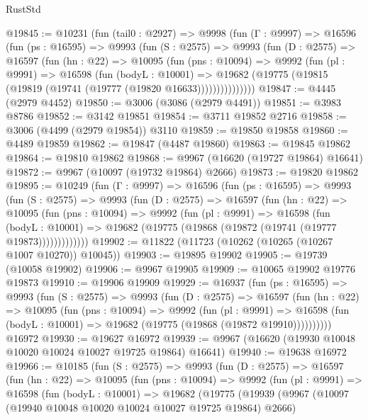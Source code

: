 \begin{lexlean}{RustStd}
\begin{coremodule}
@19845 := @10231
    (fun (tail0 : @2927) =>
    @9998
      (fun (Γ : @9997) =>
      @16596
        (fun (ps : @16595) =>
        @9993
          (fun (S : @2575) =>
          @9993
            (fun (D : @2575) =>
            @16597
              (fun (hn : @22) =>
              @10095
                (fun (pns : @10094) =>
                @9992
                  (fun (pl : @9991) =>
                  @16598
                    (fun (bodyL : @10001) =>
                    @19682 (@19775 (@19815 (@19819 (@19741 (@19777 (@19820 @16633)))))))))))))))
@19847 := @4445 (@2979 @4452)
@19850 := @3006 (@3086 (@2979 @4491))
@19851 := @3983 @8786
@19852 := @3142 @19851
@19854 := @3711 @19852 @2716
@19858 := @3006 (@4499 (@2979 @19854)) @3110
@19859 := @19850 @19858
@19860 := @4489 @19859
@19862 := @19847 (@4487 @19860)
@19863 := @19845 @19862
@19864 := @19810 @19862
@19868 := @9967 (@16620 (@19727 @19864) @16641)
@19872 := @9967 (@10097 (@19732 @19864) @2666)
@19873 := @19820 @19862
@19895 := @10249
    (fun (Γ : @9997) =>
    @16596
      (fun (ps : @16595) =>
      @9993
        (fun (S : @2575) =>
        @9993
          (fun (D : @2575) =>
          @16597
            (fun (hn : @22) =>
            @10095
              (fun (pns : @10094) =>
              @9992
                (fun (pl : @9991) =>
                @16598
                  (fun (bodyL : @10001) =>
                  @19682 (@19775 (@19868 (@19872 (@19741 (@19777 @19873)))))))))))))
@19902 := @11822 (@11723 (@10262 (@10265 (@10267 @1007 @10270)) @10045))
@19903 := @19895 @19902
@19905 := @19739 (@10058 @19902)
@19906 := @9967 @19905
@19909 := @10065 @19902 @19776 @19873
@19910 := @19906 @19909
@19929 := @16937
    (fun (ps : @16595) =>
    @9993
      (fun (S : @2575) =>
      @9993
        (fun (D : @2575) =>
        @16597
          (fun (hn : @22) =>
          @10095
            (fun (pns : @10094) =>
            @9992
              (fun (pl : @9991) =>
              @16598 (fun (bodyL : @10001) => @19682 (@19775 (@19868 (@19872 @19910))))))))))
    @16972
@19930 := @19627 @16972
@19939 := @9967 (@16620 (@19930 @10048 @10020 @10024 @10027 @19725 @19864) @16641)
@19940 := @19638 @16972
@19966 := @10185
    (fun (S : @2575) =>
    @9993
      (fun (D : @2575) =>
      @16597
        (fun (hn : @22) =>
        @10095
          (fun (pns : @10094) =>
          @9992
            (fun (pl : @9991) =>
            @16598
              (fun (bodyL : @10001) =>
              @19682
                (@19775
                  (@19939
                    (@9967
                      (@10097 (@19940 @10048 @10020 @10024 @10027 @19725 @19864) @2666)

\end{coremodule}
\end{lexlean}
